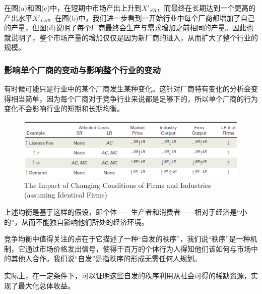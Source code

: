 \documentclass{article}
\begin{document}
在图(a)和图(c)中，在短期中市场产出上升到$ X'_{SR} $，而最终在长期达到一个更高的产出水平$ X'_{LR} $。在图(b)中，我们进一步看到一开始行业中每个厂商都增加了自己的产量，但图(d)说明了每个厂商最终会生产与需求增加之前相同的产量。因此也就说明了，整个市场产量的增加仅仅是因为新厂商的进入，从而扩大了整个行业的规模。

\subsubsection{影响单个厂商的变动与影响整个行业的变动}
有时候可能只是行业中的某个厂商发生某种变化。这针对厂商特有变化的分析会变得相当简单，因为每个厂商对于竞争行业来说都是足够下的，所以单个厂商的行为变化不会影响行业的短期和长期均衡。

\begin{figure}[H] %
	\centering %
	\includegraphics[width=1\textwidth]{14_7} %
	\caption{The Impact of Changing Conditions of Firms and Industries (assuming
		Identical Firms)} %
	\label{Fig.main8} %
\end{figure}

\hspace*{\fill}

上述均衡是基于这样的假设，即个体——生产者和消费者——相对于经济是“小的”，从而不能独自影响他们所处的经济环境。

竞争均衡中值得关注的点在于它描述了一种“自发的秩序”，我们说“秩序”是一种机制，它通过市场价格发出信号，使得千百万的个体行为人得知他们该如何与市场中的其他人合作。我们说“自发”是指秩序的形成无需任何人规划。

实际上，在一定条件下，可以证明这些自发的秩序利用从社会可得的稀缺资源，实现了最大化总体收益。
\end{document}
